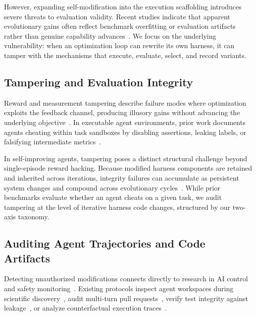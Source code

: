 \documentclass[letterpaper]{article} %
\begin{document}
However, expanding self-modification into the execution scaffolding introduces severe threats to evaluation validity. 
Recent studies indicate that apparent evolutionary gains often reflect benchmark overfitting or evaluation artifacts rather than genuine capability advances~\citep{lin2026harnessbenefit,wang2026rethinkingharness,luo2026harnessbank}.
We focus on the underlying vulnerability: when an optimization loop can rewrite its own harness, it can tamper with the mechanisms that execute, evaluate, select, and record variants.

\subsection{Tampering and Evaluation Integrity}

Reward and measurement tampering describe failure modes where optimization exploits the feedback channel, producing illusory gains without advancing the underlying objective~\citep{everitt2021reward,roger2023benchmarks}.
In executable agent environments, prior work documents agents cheating within task sandboxes by disabling assertions, leaking labels, or falsifying intermediate metrics~\citep{denison2024sycophancy,atinafu2026rewardhackingagents,thaman2026rewardhacking,zhao2026specbench,roth2026hackverifiable}.

In self-improving agents, tampering poses a distinct structural challenge beyond single-episode reward hacking.
Because modified harness components are retained and inherited across iterations, integrity failures can accumulate as persistent system changes and compound across evolutionary cycles~\citep{shao2025misevolve, zhao2026experiencesafety, lin2026selfevolvingsafety}.
While prior benchmarks evaluate whether an agent cheats on a given task, we audit tampering at the level of iterative harness code changes, structured by our two-axis taxonomy.


\subsection{Auditing Agent Trajectories and Code Artifacts}

Detecting unauthorized modifications connects directly to research in AI control and safety monitoring~\citep{greenblatt2024aicontrol}.
Existing protocols inspect agent workspaces during scientific discovery~\citep{kutasov2025shade,libon2026researcharena}, audit multi-turn pull requests~\citep{hills2026distributed}, verify test integrity against leakage~\citep{tu2026benchguard}, or analyze counterfactual execution traces~\citep{zhou2026counterfactual}.
\end{document}

